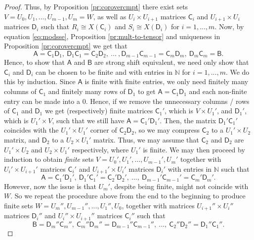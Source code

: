 \documentclass[11pt, letterpaper,final]{amsart}
\theoremstyle{definition}
\begin{document}
\begin{proof}
Thus, by Proposition \ref{pr:corovercmpt} there exist sets $V=U_0, U_1,...,U_{m-1},U_m = W$, as well as $U_i \times U_{i+1}$ matrices $\mathsf{C}_i$ and $U_{i+1} \times U_i$ matrices $\mathsf{D}_i$ such that $R_i \cong X(\mathsf{C}_i)$ and $S_i \cong X(\mathsf{D}_i)$ for $i=1,...,m$. Now, by equation \eqref{eq:modsse}, Proposition \ref{pr:mult-to-tensor} and uniqueness in Proposition \ref{pr:corovercmpt} we get that
$$
\mathsf{A} = \mathsf{C}_1\mathsf{D}_1, \ \mathsf{D}_1\mathsf{C}_1 = \mathsf{C}_2\mathsf{D}_2, \ ... \ , \mathsf{D}_{m-1}\mathsf{C}_{m-1} = \mathsf{C}_m\mathsf{D}_m, \ \mathsf{D}_m\mathsf{C}_m = \mathsf{B}.
$$
Hence, to show that $\mathsf{A}$ and $\mathsf{B}$ are strong shift equivalent, we need only show that $\mathsf{C}_i$ and $\mathsf{D}_i$ can be chosen to be finite and with entries in $\mathbb{N}$ for $i=1,...,m$. We do this by induction. Since $\mathsf{A}$ is finite with finite entries, we only need finitely many columns of $\mathsf{C}_1$ and finitely many rows of $\mathsf{D}_1$ to get $\mathsf{A}=\mathsf{C}_1\mathsf{D}_1$ and each non-finite entry can be made into a $0$. Hence, if we remove the unnecessary columns / rows of $\mathsf{C}_1$ and $\mathsf{D}_1$ we get (respectively) finite matrices $\mathsf{C}_1'$, which is $V\times U_1'$, and $\mathsf{D}_1'$, which is $U_1'\times V$, such that we still have $\mathsf{A}=\mathsf{C}_1'\mathsf{D}_1'$. Then, the matrix $\mathsf{D}_1'\mathsf{C}_1'$ coincides with the $U_1'\times U_1'$ corner of $\mathsf{C}_2\mathsf{D}_2$, so we may compress $\mathsf{C}_2$ to a $U_1' \times U_2$ matrix, and $\mathsf{D}_2$ to a $U_2 \times U_1'$ matrix. Thus, we may assume that $\mathsf{C}_2$ and $\mathsf{D}_2$ are $U_1'\times U_2$ and $U_2\times U_1'$ respectively, where $U_1'$ is finite. We may then proceed by induction to obtain \emph{finite} sets $V = U_0',U_1',...,U_{m-1}',U_m'$ together with $U_i' \times U_{i+1}'$ matrices $\mathsf{C}_i'$ and $U_{i+1}' \times U_i'$ matrices $\mathsf{D}_i'$ with entries in $\mathbb{N}$ such that
$$
\mathsf{A} = \mathsf{C}_1'\mathsf{D}_1', \ \mathsf{D}_1'\mathsf{C}_1' = \mathsf{C}_2'\mathsf{D}_2', \ ... , \ \mathsf{D}_{m-1}'\mathsf{C}_{m-1}' = \mathsf{C}_m'\mathsf{D}_m'.
$$
However, now the issue is that $U_m'$, despite being finite, might not coincide with $W$. So we repeat the procedure above from the end to the beginning to produce finite sets $W=U_m'',U_{m-1}'',...,U_1'',U_0$, together with matrices $U_{i+1}'' \times U_i''$ matrices $\mathsf{D}_i''$ and $U_i'' \times U_{i+1}''$ matrices $\mathsf{C}_i''$ such that
$$
\mathsf{B} = \mathsf{D}_m''\mathsf{C}_m'', \ \mathsf{C}_m''\mathsf{D}_m'' = \mathsf{D}_{m-1}''\mathsf{C}_{m-1}'', \ ... , \ \mathsf{C}_2''\mathsf{D}_2'' = \mathsf{D}_1''\mathsf{C}_1''.
$$
\end{proof}
\end{document}
